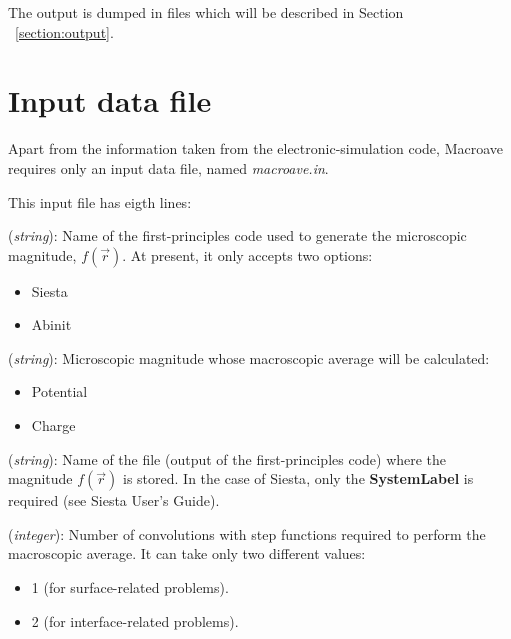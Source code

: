  The output is dumped in files which will be described
 in Section ~\ref{section:output}.

\section{Input data file}
\label{section:input}

 Apart from the information taken from the electronic-simulation 
 code, {\sc Macroave} requires only an input data file, 
 named {\it macroave.in}. 

 This input file has eigth lines:

 \begin{description}
 \itemsep 10pt
 \parsep 0pt

 \item[{\bf first line}] ({\it string}): 
      Name of the first-principles code used to generate the 
      microscopic magnitude, $f \left( \vec{r} \right)$. 
      At present, it only accepts two options:

      \begin{itemize}
         \item Siesta
         \item Abinit
      \end{itemize}

 \item[{\bf second line}] ({\it string}): 
      Microscopic magnitude whose macroscopic average will be calculated:
      \begin{itemize}
         \item Potential
         \item Charge
      \end{itemize}

 \item[{\bf third line}] ({\it string}): 
      Name of the file (output of the first-principles code)
      where the magnitude $f \left( \vec{r} \right)$ is stored.
      In the case of {\sc Siesta}, only the {\bf SystemLabel} is required
      (see {\sc Siesta} User's Guide).

 \item[{\bf fourth line}] ({\it integer}): 
      Number of convolutions with step functions required to 
      perform the macroscopic average. It can take only two different
      values: 
      \begin{itemize}
         \item 1 (for surface-related problems).
         \item 2 (for interface-related problems).
      \end{itemize}



\end{description}
